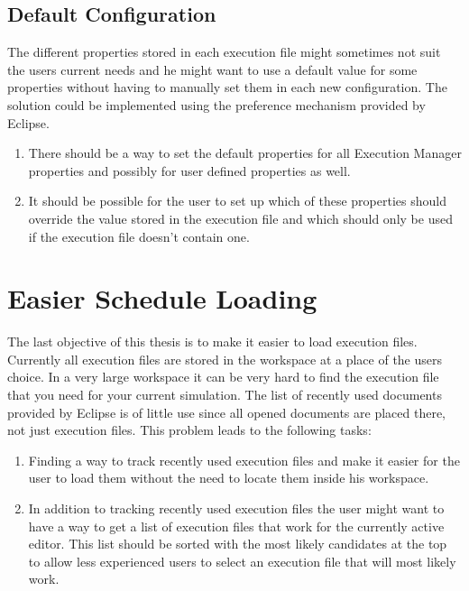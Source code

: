 \subsection{Default Configuration}
\label{section:ConfTaskDefaultConfig}
The different properties stored in each execution file might sometimes not suit the users current needs
and he might want to use a default value for some properties without having to manually set them
in each new configuration.
The solution could be implemented using the preference mechanism provided by Eclipse.
\begin{enumerate}
 \item There should be a way to set the default properties for all Execution Manager properties 
and possibly for user defined properties as well.
 \item It should be possible for the user to set up which of these properties should override 
the value stored in the execution file and which should only be used if the execution file doesn't contain one.
\end{enumerate}

\section{Easier Schedule Loading}
\label{section:ConfTaskEasyLoading}
The last objective of this thesis is to make it easier to load execution files.
Currently all execution files are stored in the workspace at a place of the users choice. In a very
large workspace it can be very hard to find the execution file that you need for your current
simulation. The list of recently used documents provided by Eclipse is of little use since all
opened documents are placed there, not just execution files.
This problem leads to the following tasks:
\begin{enumerate}
 \item Finding a way to track recently used execution files and make it easier for the user to
load them without the need to locate them inside his workspace.
 \item In addition to tracking recently used execution files the user might want to have a way to get a list
of execution files that work for the currently active editor. This list should be sorted with the most likely
candidates at the top to allow less experienced users to select an execution file that will most likely work.
\end{enumerate}
